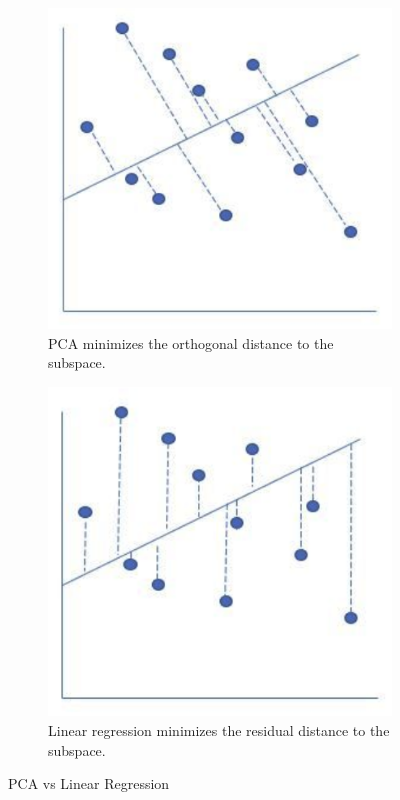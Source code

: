     \begin{figure}[H]
      \centering
      \begin{subfigure}[b]{0.3\textwidth}
      \centering
        \includegraphics[width=\textwidth]{img/pca_ortho.png}
        \caption{PCA minimizes the orthogonal distance to the subspace. }
      \end{subfigure}
      \begin{subfigure}[b]{0.3\textwidth}
      \centering
        \includegraphics[width=\textwidth]{img/lin_reg_vert.png}
        \caption{Linear regression minimizes the residual distance to the subspace.} 
      \end{subfigure}
      \caption{PCA vs Linear Regression}
      \label{fig:pca_lin_reg}
    \end{figure}

